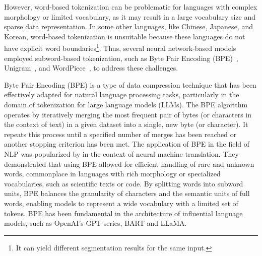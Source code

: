 However, word-based tokenization can be problematic for languages with complex morphology or limited vocabulary, as it may result in a large vocabulary size and sparse data representation.
In some other languages, like Chinese, Japanese, and Korean, word-based tokenization is unsuitable because these languages do not have explicit word boundaries\footnote{It can yield different segmentation results for the same input.}.
Thus, several neural network-based models employed subword-based tokenization, such as Byte Pair Encoding (BPE)~\cite{sennrich2016neural}, Unigram~\cite{kudo2018sentencepiece}, and WordPiece~\cite{wu2016google}, to address these challenges.

Byte Pair Encoding (BPE) is a type of data compression technique that has been effectively adapted for natural language processing tasks, particularly in the domain of tokenization for large language models (LLMs).
The BPE algorithm operates by iteratively merging the most frequent pair of bytes (or characters in the context of text) in a given dataset into a single, new byte (or character). It repeats this process until a specified number of merges has been reached or another stopping criterion has been met.
The application of BPE in the field of NLP was popularized by \textcite{sennrich2016neural} in the context of neural machine translation.
They demonstrated that using BPE allowed for efficient handling of rare and unknown words, commonplace in languages with rich morphology or specialized vocabularies, such as scientific texts or code.
By splitting words into subword units, BPE balances the granularity of characters and the semantic units of full words, enabling models to represent a wide vocabulary with a limited set of tokens.
BPE has been fundamental in the architecture of influential language models, such as OpenAI's GPT series, BART and LLaMA\@.

